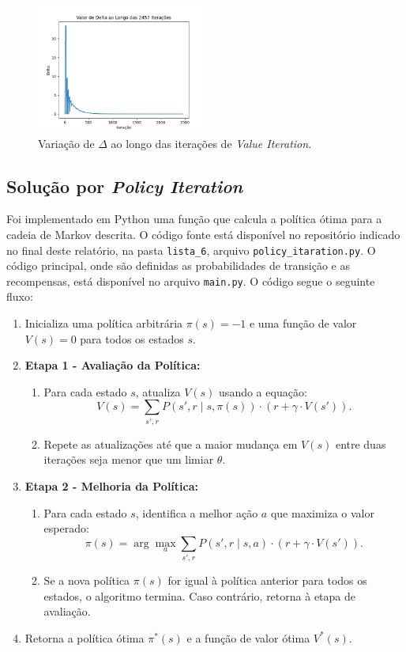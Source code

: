 \begin{figure}[H]
    \centering
    \includegraphics[width=0.5\textwidth]{fig/value_iteration_delta.png}
    \caption{Variação de $\Delta$ ao longo das iterações de \textit{Value Iteration}.}
    \label{fig:value_iteration_delta}
\end{figure}



\subsection*{Solução por \textit{Policy Iteration}}

Foi implementado em Python uma função que calcula a política ótima para a cadeia de Markov descrita. O código fonte está disponível no repositório indicado no final deste relatório, na pasta \texttt{lista\_6}, arquivo \texttt{policy\_itaration.py}. O código principal, onde são definidas as probabilidades de transição e as recompensas, está disponível no arquivo \texttt{main.py}. O código segue o seguinte fluxo:

\begin{enumerate}
    \item Inicializa uma política arbitrária \( \pi(s) = -1 \) e uma função de valor \( V(s) = 0 \) para todos os estados \( s \).
    \item \textbf{Etapa 1 - Avaliação da Política:}
    \begin{enumerate}
        \item Para cada estado \( s \), atualiza \( V(s) \) usando a equação:
        \[
        V(s) = \sum_{s',r} P(s', r \mid s, \pi(s)) \cdot \left( r + \gamma \cdot V(s') \right).
        \]
        \item Repete as atualizações até que a maior mudança em \( V(s) \) entre duas iterações seja menor que um limiar \( \theta \).
    \end{enumerate}
    \item \textbf{Etapa 2 - Melhoria da Política:}
    \begin{enumerate}
        \item Para cada estado \( s \), identifica a melhor ação \( a \) que maximiza o valor esperado:
        \[
        \pi(s) = \arg\max_a \sum_{s', r} P(s', r \mid s, a) \cdot \left( r + \gamma \cdot V(s') \right).
        \]
        \item Se a nova política \( \pi(s) \) for igual à política anterior para todos os estados, o algoritmo termina. Caso contrário, retorna à etapa de avaliação.
    \end{enumerate}
    \item Retorna a política ótima \( \pi^*(s) \) e a função de valor ótima \( V^*(s) \).
\end{enumerate}

